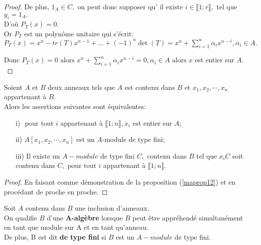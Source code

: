 \begin{proof}
	De plus, $1_A\in C,$ on peut donc supposer qu' $\text{il existe } i\in \llbracket 1; r \rrbracket ,$ tel que $y_{i}=1_A.$\\
	D'où $P_{T}(x)=0.$\\
	Or $P_{T}$ est un polynôme unitaire qui s'écrit:\\ $P_{T}(x)=x^{n}-tr(T)x^{n-1}+...+(-1)^{n}\det
	(T)=x^{n}+\sum\limits_{i=1}^{n}\alpha _{i}x^{n-i},\alpha _{i}\in A.$
	
	Donc $P_{T}(x)=0\text{ alors } x^{n}+\sum\limits_{i=1}^{n}\alpha
	_{i}x^{n-i}=0,\alpha _{i}\in A\text{ alors } x$ est entier sur $A.$
	
\end{proof}
\begin{moncorollaire}
	Soient $A$ et $B$ deux anneaux tels que $A $ est contenu dans $  B$ et $x_1, x_2, \cdots, x_n $ appartenant à $ B$.\\
	Alors les assertions suivantes sont équivalentes:
	\begin{enumerate}
		\item[i)]$\text{ pour tout } i $ appartenant à $ \llbracket 1; n \rrbracket, x_i$ est entier sur $A$;
		\item[ii)]$A[x_1, x_2, \cdots, x_n]$ est un $A$-module de type fini;
		\item[iii)]Il existe un $A-module$ de type fini $C,$ contenu dans $  B$ tel que $x_i C $ soit contenu dans $  C, \text{ pour tout } i $ appartenant à $ \llbracket 1; n \rrbracket$.
	\end{enumerate}
\end{moncorollaire}
\begin{proof}
	En faisant comme démonstration de la proposition (\ref{maprop12}) et en procédant de proche en proche. 
\end{proof}

\begin{madefinition}
	Soit $A $ contenu dans $ B$ une inclusion d'anneaux.\\
	On qualifie $B$ d'une \textbf{A-algèbre} lorsque $B$ peut être appréhendé simultanément en tant que module sur A et en tant qu'anneau.\\
	De plus, B est dit \textbf{de type fini} si $B$ est un $A-module$ de type fini.
\end{madefinition}

